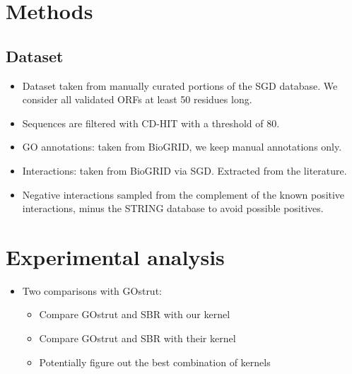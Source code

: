 \documentclass{bioinfo}
\begin{document}
\begin{methods}



\section{Methods}

\subsection{Dataset}

\begin{itemize}
    \item Dataset taken from manually curated portions of the SGD database. We
    consider all validated ORFs at least 50 residues long.

    \item Sequences are filtered with CD-HIT with a threshold of 80.

    \item GO annotations: taken from BioGRID, we keep manual annotations only.

    \item Interactions: taken from BioGRID via SGD. Extracted from the
    literature.

    \item Negative interactions sampled from the complement of the known
    positive interactions, minus the STRING database to avoid possible
    positives.

\end{itemize}



\section{Experimental analysis}

\begin{itemize}

    \item Two comparisons with GOstrut:

    \begin{itemize}

        \item Compare GOstrut and SBR with our kernel

        \item Compare GOstrut and SBR with their kernel

        \item Potentially figure out the best combination of kernels


\end{itemize}
\end{itemize}
\end{methods}
\end{document}
